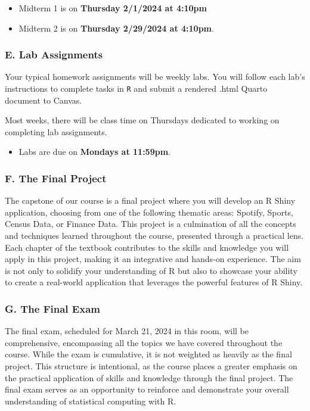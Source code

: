 \documentclass[
  11pt,
  letterpaper,
  DIV=11,
  numbers=noendperiod]{scrartcl}
\providecommand{\tightlist}{%
  \setlength{\itemsep}{0pt}\setlength{\parskip}{0pt}}\usepackage{longtable,booktabs,array}
\begin{document}
\begin{itemize}
\tightlist
\item
  Midterm 1 is on \textbf{Thursday 2/1/2024 at 4:10pm}
\item
  Midterm 2 is on \textbf{Thursday 2/29/2024 at 4:10pm}.
\end{itemize}

\hypertarget{e.-lab-assignments}{%
\subsubsection{E. Lab Assignments}\label{e.-lab-assignments}}

Your typical homework assignments will be weekly labs. You will follow
each lab's instructions to complete tasks in \texttt{R} and submit a
rendered .html Quarto document to Canvas.

Most weeks, there will be class time on Thursdays dedicated to working
on completing lab assignments.

\begin{itemize}
\tightlist
\item
  Labs are due on \textbf{Mondays at 11:59pm}.
\end{itemize}

\hypertarget{f.-the-final-project}{%
\subsubsection{F. The Final Project}\label{f.-the-final-project}}

The capstone of our course is a final project where you will develop an
R Shiny application, choosing from one of the following thematic areas:
Spotify, Sports, Census Data, or Finance Data. This project is a
culmination of all the concepts and techniques learned throughout the
course, presented through a practical lens. Each chapter of the textbook
contributes to the skills and knowledge you will apply in this project,
making it an integrative and hands-on experience. The aim is not only to
solidify your understanding of R but also to showcase your ability to
create a real-world application that leverages the powerful features of
R Shiny.

\hypertarget{g.-the-final-exam}{%
\subsubsection{G. The Final Exam}\label{g.-the-final-exam}}

The final exam, scheduled for March 21, 2024 in this room, will be
comprehensive, encompassing all the topics we have covered throughout
the course. While the exam is cumulative, it is not weighted as heavily
as the final project. This structure is intentional, as the course
places a greater emphasis on the practical application of skills and
knowledge through the final project. The final exam serves as an
opportunity to reinforce and demonstrate your overall understanding of
statistical computing with R.
\end{document}
